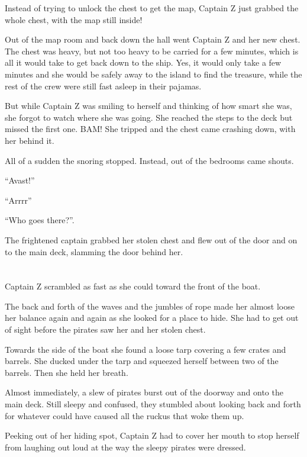 \documentclass[12pt]{extbook}
\begin{document}
  Instead of trying to unlock the chest to get the map, Captain Z just
  grabbed the whole chest, with the map still inside!
  
  Out of the map room and back down the hall went Captain Z and her new
  chest. The chest was heavy, but not too heavy to be carried for a few
  minutes, which is all it would take to get back down to the ship. Yes,
  it would only take a few minutes and she would be safely away to the
  island to find the treasure, while the rest of the crew were still fast
  asleep in their pajamas.
  
  But while Captain Z was smiling to herself and thinking of how smart she
  was, she forgot to watch where she was going. She reached the steps to
  the deck but missed the first one. BAM! She tripped and the chest came
  crashing down, with her behind it.
  
  All of a sudden the snoring stopped. Instead, out of the bedrooms came
  shouts.
  
  \enquote{Avast!}
  
  \enquote{Arrrr}
  
  \enquote{Who goes there?}.
  
  The frightened captain grabbed her stolen chest and flew out of the door
  and on to the main deck, slamming the door behind her.
  
  \section{}\label{section-4}
  
  Captain Z scrambled as fast as she could toward the front of the boat.
  
  The back and forth of the waves and the jumbles of rope made her almost
  loose her balance again and again as she looked for a place to hide. She
  had to get out of sight before the pirates saw her and her stolen chest.
  
  Towards the side of the boat she found a loose tarp covering a few
  crates and barrels. She ducked under the tarp and squeezed herself
  between two of the barrels. Then she held her breath.
  
  Almost immediately, a slew of pirates burst out of the doorway and onto
  the main deck. Still sleepy and confused, they stumbled about looking
  back and forth for whatever could have caused all the ruckus that woke
  them up.
  
  Peeking out of her hiding spot, Captain Z had to cover her mouth to stop
  herself from laughing out loud at the way the sleepy pirates were
  dressed.
  
\end{document}
